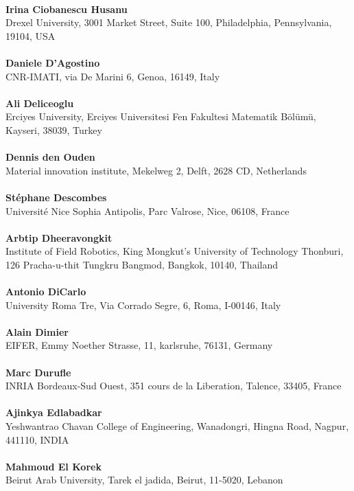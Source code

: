 \\ 
\textbf{Irina Ciobanescu Husanu}
\\ 
Drexel University, 3001 Market Street, Suite 100, Philadelphia, Pennsylvania, 19104, USA\\ 
\\ 
\textbf{Daniele D'Agostino}
\\ 
CNR-IMATI, via De Marini 6, Genoa, 16149, Italy\\ 
\\ 
\textbf{Ali Deliceoglu}
\\ 
Erciyes University, Erciyes Universitesi Fen Fakultesi Matematik B\"ol\"um\"u, Kayseri, 38039, Turkey\\ 
\\ 
\textbf{Dennis den Ouden}
\\ 
Material innovation institute, Mekelweg 2, Delft, 2628 CD, Netherlands\\ 
\\ 
\textbf{St\'ephane Descombes}
\\ 
Universit\'e Nice Sophia Antipolis, Parc Valrose, Nice, 06108, France\\ 
\\ 
\textbf{Arbtip Dheeravongkit}
\\ 
Institute of Field Robotics, King Mongkut's University of Technology Thonburi, 126 Pracha-u-thit Tungkru Bangmod, Bangkok, 10140, Thailand\\ 
\\ 
\textbf{Antonio DiCarlo}
\\ 
University Roma Tre, Via Corrado Segre, 6, Roma, I-00146, Italy\\ 
\\ 
\textbf{Alain Dimier}
\\ 
EIFER, Emmy Noether Strasse, 11, karlsruhe, 76131, Germany\\ 
\\ 
\textbf{Marc Durufle}
\\ 
INRIA Bordeaux-Sud Ouest, 351 cours de la Liberation, Talence, 33405, France\\ 
\\ 
\textbf{Ajinkya Edlabadkar}
\\ 
Yeshwantrao Chavan College of Engineering, Wanadongri, Hingna Road, Nagpur, 441110, INDIA\\ 
\\ 
\textbf{Mahmoud El Korek}
\\ 
Beirut Arab University, Tarek el jadida, Beirut, 11-5020, Lebanon\\ 
